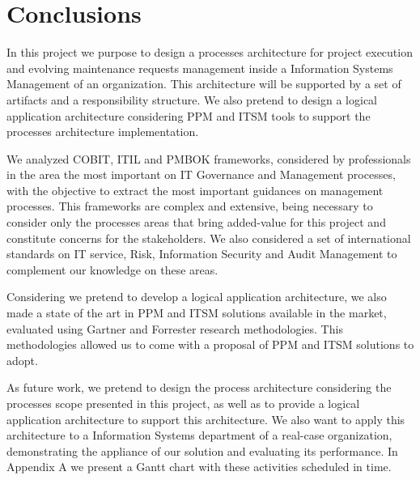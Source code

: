 
% 
% 

\section{Conclusions}

In this project we purpose to design a processes architecture for project execution and evolving maintenance requests management inside a Information Systems Management of an organization. This architecture will be supported by a set of artifacts and a responsibility structure. We also pretend to design a logical application architecture considering PPM and ITSM tools to support the processes architecture implementation.\par
We analyzed COBIT, ITIL and PMBOK frameworks, considered by professionals in the area the most important on IT Governance and Management processes, with the objective to extract the most important guidances on management processes. This frameworks are complex and extensive, being necessary to consider only the processes areas that bring added-value for this project and constitute concerns for the stakeholders. We also considered a set of international standards on IT service, Risk, Information Security and Audit Management to complement our knowledge on these areas.\par
Considering we pretend to develop a logical application architecture, we also made a state of the art in PPM and ITSM solutions available in the market, evaluated using Gartner and Forrester research methodologies. This methodologies allowed us to come with a proposal of PPM and ITSM solutions to adopt.\par
As future work, we pretend to design the process architecture considering the processes scope presented in this project, as well as to provide a logical application architecture to support this architecture. We also want to apply this architecture to a Information Systems department of a real-case organization, demonstrating the appliance of our solution and evaluating its performance. In Appendix A we present a Gantt chart with these activities scheduled in time.\par 
